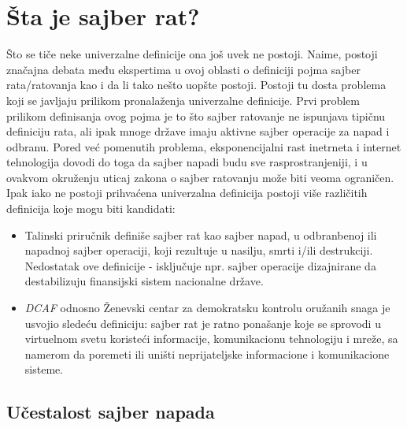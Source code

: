 \documentclass[a4paper]{article}
\begin{document}
{\section{Šta je sajber rat?}
Što se tiče neke univerzalne definicije ona još uvek ne postoji.
Naime, postoji značajna debata među ekspertima u ovoj oblasti o definiciji pojma sajber rata/ratovanja kao i da li tako nešto uopšte postoji. Postoji tu dosta problema koji se javljaju prilikom pronalaženja univerzalne definicije.
Prvi problem prilikom definisanja ovog pojma je to što sajber ratovanje ne ispunjava tipičnu definiciju rata, ali ipak mnoge države imaju aktivne sajber operacije za napad i odbranu. Pored već pomenutih problema, eksponencijalni rast inetrneta i internet tehnologija dovodi do toga da sajber napadi budu sve rasprostranjeniji, i u ovakvom okruženju uticaj zakona o sajber ratovanju može biti veoma ograničen.
Ipak iako ne postoji prihvaćena univerzalna definicija postoji više različitih definicija koje mogu biti kandidati:

\begin{itemize}
\item  Talinski priručnik definiše sajber rat kao sajber napad, u
odbranbenoj ili napadnoj sajber operaciji, koji rezultuje u
nasilju, smrti i/ili destrukciji. Nedostatak ove definicije -
isključuje npr. sajber operacije dizajnirane da destabilizuju
finansijski sistem nacionalne države.
\item \emph{DCAF} odnosno Ženevski centar za demokratsku kontrolu oružanih snaga je usvojio sledeću definiciju: sajber rat je ratno ponašanje koje se sprovodi u virtuelnom svetu koristeći informacije, komunikacionu tehnologiju i mreže, sa namerom da poremeti ili uništi neprijateljske informacione i komunikacione sisteme.


\end{itemize} 




\subsection{Učestalost sajber napada}	
\label{sec:termini_i_citiranje}


}
\end{document}
